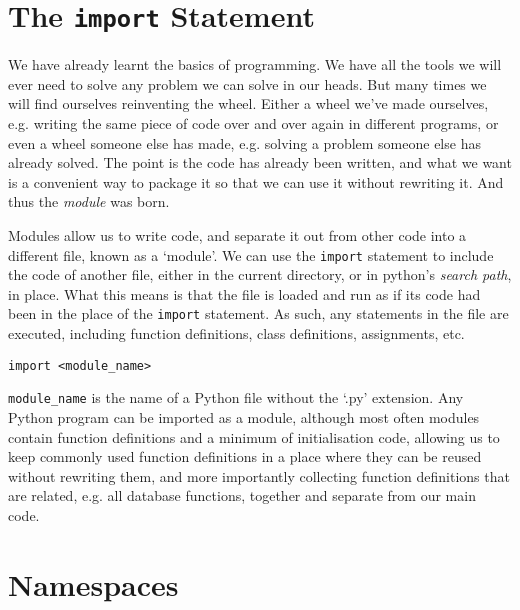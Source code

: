 \section{The \texttt{import} Statement}

We have already learnt the basics of programming. We have all the   tools we will ever need to solve any problem we can solve in our heads.   But many times we will find ourselves reinventing the wheel. Either a   wheel we've made ourselves, e.g. writing the same piece of code over   and over again in different programs, or even a wheel someone else has   made, e.g. solving a problem someone else has already solved. The point   is the code has already been written, and what we want is a convenient   way to package it so that we can use it without rewriting it. And thus   the \textit{module} was born.

Modules allow us to write code, and separate it out from other code   into a different file, known as a `module'. We can use the \texttt{import}   statement to include the code of another file, either in the   current directory, or in python's \textit{search path}, in   place. What this means is that the file is loaded and run as if its   code had been in the place of the \texttt{import} statement. As such, any   statements in the file are executed, including function definitions,   class definitions, assignments, etc.
\begin{lstlisting}
import <module_name>
\end{lstlisting}

\texttt{module\_name} is the name of a Python file without the `.py'   extension. Any Python program can be imported as a module, although   most often modules contain function definitions and a minimum of   initialisation code, allowing us to keep commonly used function   definitions in a place where they can be reused without rewriting them,   and more importantly collecting function definitions that are related,   e.g. all database functions, together and separate from our main   code.

\section{Namespaces}

